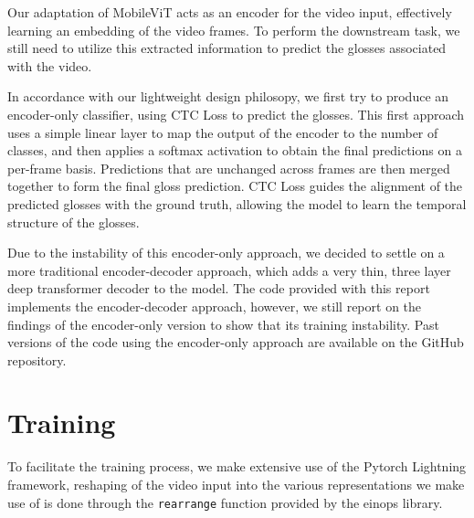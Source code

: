 \documentclass{IEEEtran}
\begin{document}
Our adaptation of MobileViT\cite{mehta_mobilevit_2022} acts as an encoder for the video input, effectively learning an embedding of the video frames. To perform the downstream task, we still need to utilize this extracted information to predict the glosses associated with the video.

In accordance with our lightweight design philosopy, we first try to produce an encoder-only classifier, using CTC Loss\cite{graves_connectionist_nodate} to predict the glosses. This first approach uses a simple linear layer to map the output of the encoder to the number of classes, and then applies a softmax activation to obtain the final predictions on a per-frame basis. Predictions that are unchanged across frames are then merged together to form the final gloss prediction. CTC Loss guides the alignment of the predicted glosses with the ground truth, allowing the model to learn the temporal structure of the glosses.

Due to the instability of this encoder-only approach, we decided to settle on a more traditional encoder-decoder approach, which adds a very thin, three layer deep transformer decoder to the model. The code provided with this report implements the encoder-decoder approach, however, we still report on the findings of the encoder-only version to show that its training instability. Past versions of the code using the encoder-only approach are available on the GitHub repository.

\section{Training}

To facilitate the training process, we make extensive use of the Pytorch Lightning\cite{Falcon_PyTorch_Lightning_2019} framework, reshaping of the video input into the various representations we make use of is done through the \texttt{rearrange} function provided by the einops\cite{Rogozhnikov_Einops_Clear_and_2022} library.
\end{document}
